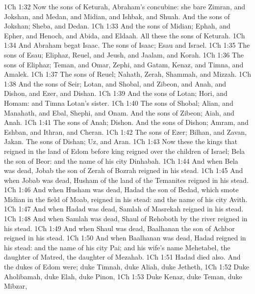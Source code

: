 \vs 1Ch 1:32 Now the sons of Keturah, Abraham's concubine: she bare Zimran, and Jokshan, and Medan, and Midian, and Ishbak, and Shuah. And the sons of Jokshan; Sheba, and Dedan.
\vs 1Ch 1:33 And the sons of Midian; Ephah, and Epher, and Henoch, and Abida, and Eldaah. All these  the sons of Keturah.
\vs 1Ch 1:34 And Abraham begat Isaac. The sons of Isaac; Esau and Israel.
\vs 1Ch 1:35 The sons of Esau; Eliphaz, Reuel, and Jeush, and Jaalam, and Korah.
\vs 1Ch 1:36 The sons of Eliphaz; Teman, and Omar, Zephi, and Gatam, Kenaz, and Timna, and Amalek.
\vs 1Ch 1:37 The sons of Reuel; Nahath, Zerah, Shammah, and Mizzah.
\vs 1Ch 1:38 And the sons of Seir; Lotan, and Shobal, and Zibeon, and Anah, and Dishon, and Ezer, and Dishan.
\vs 1Ch 1:39 And the sons of Lotan; Hori, and Homam: and Timna  Lotan's sister.
\vs 1Ch 1:40 The sons of Shobal; Alian, and Manahath, and Ebal, Shephi, and Onam. And the sons of Zibeon; Aiah, and Anah.
\vs 1Ch 1:41 The sons of Anah; Dishon. And the sons of Dishon; Amram, and Eshban, and Ithran, and Cheran.
\vs 1Ch 1:42 The sons of Ezer; Bilhan, and Zavan,  Jakan. The sons of Dishan; Uz, and Aran.
\vs 1Ch 1:43 Now these  the kings that reigned in the land of Edom before  king reigned over the children of Israel; Bela the son of Beor: and the name of his city  Dinhabah.
\vs 1Ch 1:44 And when Bela was dead, Jobab the son of Zerah of Bozrah reigned in his stead.
\vs 1Ch 1:45 And when Jobab was dead, Husham of the land of the Temanites reigned in his stead.
\vs 1Ch 1:46 And when Husham was dead, Hadad the son of Bedad, which smote Midian in the field of Moab, reigned in his stead: and the name of his city  Avith.
\vs 1Ch 1:47 And when Hadad was dead, Samlah of Masrekah reigned in his stead.
\vs 1Ch 1:48 And when Samlah was dead, Shaul of Rehoboth by the river reigned in his stead.
\vs 1Ch 1:49 And when Shaul was dead, Baalhanan the son of Achbor reigned in his stead.
\vs 1Ch 1:50 And when Baalhanan was dead, Hadad reigned in his stead: and the name of his city  Pai; and his wife's name  Mehetabel, the daughter of Matred, the daughter of Mezahab.
\vs 1Ch 1:51 Hadad died also. And the dukes of Edom were; duke Timnah, duke Aliah, duke Jetheth,
\vs 1Ch 1:52 Duke Aholibamah, duke Elah, duke Pinon,
\vs 1Ch 1:53 Duke Kenaz, duke Teman, duke Mibzar,
